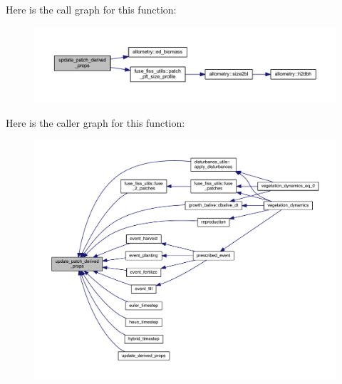 Here is the call graph for this function\+:\nopagebreak
\begin{figure}[H]
\begin{center}
\leavevmode
\includegraphics[width=350pt]{update__derived__props_8f90_a4ec6edacfccb9d8d6f5a6d6e8f2c30a0_cgraph}
\end{center}
\end{figure}




Here is the caller graph for this function\+:\nopagebreak
\begin{figure}[H]
\begin{center}
\leavevmode
\includegraphics[width=350pt]{update__derived__props_8f90_a4ec6edacfccb9d8d6f5a6d6e8f2c30a0_icgraph}
\end{center}
\end{figure}


\hypertarget{update__derived__props_8f90_ac2c4d4bf81270f392d3947836f8fefa4}{}
